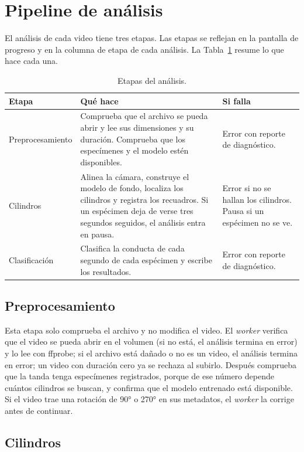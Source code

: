 \section{Pipeline de análisis}

El análisis de cada video tiene tres etapas. Las etapas se reflejan en la pantalla de progreso y en la
columna de etapa de cada análisis. La Tabla~\ref{tab:etapas} resume lo que hace cada una.

\begin{table}[H]
\centering
\caption{Etapas del análisis.}
\label{tab:etapas}
\begin{tabular}{|p{3.2cm}|p{6.4cm}|p{5.0cm}|}
\hline
\textbf{Etapa} & \textbf{Qué hace} & \textbf{Si falla} \\
\hline
Preprocesamiento & Comprueba que el archivo se pueda abrir y lee sus dimensiones y su duración. Comprueba que los especímenes y el modelo estén disponibles. & Error con reporte de diagnóstico. \\
\hline
Cilindros & Alinea la cámara, construye el modelo de fondo, localiza los cilindros y registra los recuadros. Si un espécimen deja de verse tres segundos seguidos, el análisis entra en pausa. & Error si no se hallan los cilindros. Pausa si un espécimen no se ve. \\
\hline
Clasificación & Clasifica la conducta de cada segundo de cada espécimen y escribe los resultados. & Error con reporte de diagnóstico. \\
\hline
\end{tabular}
\end{table}

\subsection{Preprocesamiento}

Esta etapa solo comprueba el archivo y no modifica el video. El \textit{worker} verifica que el video se pueda
abrir en el volumen (si no está, el análisis termina en error) y lo lee con ffprobe; si el archivo está dañado o
no es un video, el análisis termina en error; un video con duración cero ya se rechaza al subirlo. Después comprueba que
la tanda tenga especímenes registrados, porque de ese número depende cuántos cilindros se buscan, y confirma que el
modelo entrenado está disponible. Si el video trae una rotación de 90° o 270° en sus metadatos, el \textit{worker} la
corrige antes de continuar.

\subsection{Cilindros}

